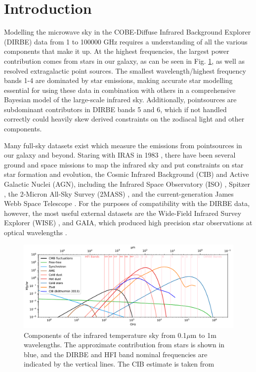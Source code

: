 \documentclass{aa}
\begin{document}
\section{Introduction}

Modelling the microwave sky in the COBE-Diffuse Infrared Background Explorer (DIRBE) data  \citep{DIRBE} from 1 to 100000 GHz requires a  understanding of all the various components that make it up. At the highest frequencies, the largest power contribution comes from stars in our galaxy, as can be seen in Fig. \ref{fig:sed}, as well as resolved extragalactic point sources. The smallest wavelength/highest frequency bands 1-4 are dominated by star emissions, making accurate star modelling essential for using these data in combination with others in a comprehensive Bayesian model of the large-scale infrared sky. Additionally, pointsources are subdominant contributors in DIRBE bands 5 and 6, which if not handled correctly could heavily skew derived constraints on the zodiacal light and other components.

Many full-sky datasets exist which measure the emissions from pointsources in our galaxy and beyond. Staring with IRAS in 1983 \citep{iras}, there have been several ground and space missions to map the infrared sky and put constraints on star star formation and evolution, the Cosmic Infrared Background (CIB) and Active Galactic Nuclei (AGN), including the Infrared Space Observatory (ISO) \citep{iso}, Spitzer \citep{spitzer}, the 2-Micron All-Sky Survey (2MASS) \citep{2mass}, and the current-generation James Webb Space Telescope \citep{jwst}. For the purposes of compatibility with the DIRBE data, however, the most useful external datasets are the Wide-Field Infrared Survey Explorer (WISE) \citep{wise}, and GAIA, which produced high precision star observations at optical wavelengths \citep{gaia, gaia2}. 

\begin{figure}
  \centering
  \includegraphics[width=\textwidth]{figs/sed/all_fgs.pdf}
  \caption{Components of the infrared temperature sky from 0.1$\mu$m to 1m wavelengths. The approximate contribution from stars is shown in blue, and the DIRBE and HFI band nominal frequencies are indicated by the vertical lines. The CIB estimate is taken from \cite{cibCurve}}
  \label{fig:sed}
\end{figure}
\end{document}

